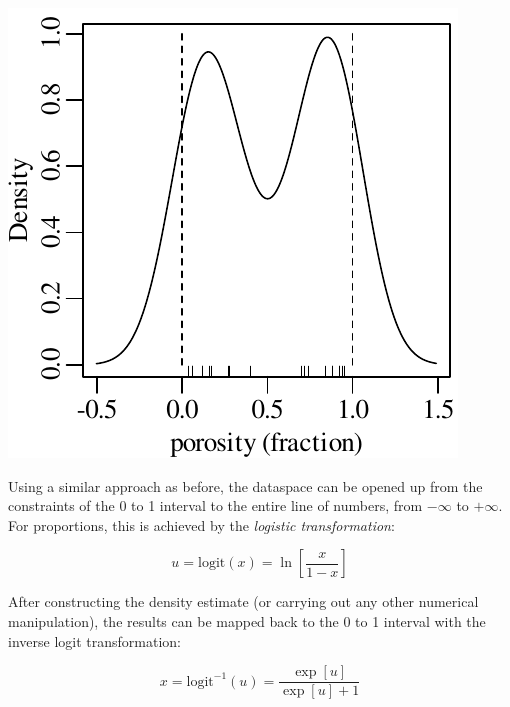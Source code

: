\noindent\begin{minipage}[t][][b]{.3\textwidth}
  \includegraphics[width=\textwidth]{../figures/porosityKDE.pdf}\\
\end{minipage}
\begin{minipage}[t][][t]{.7\textwidth}
  \label{fig:porosityKDE}
\end{minipage}

Using a similar approach as before, the dataspace can be opened up
from the constraints of the 0 to 1 interval to the entire line of
numbers, from $-\infty$ to $+\infty$. For proportions, this is
achieved by the \emph{logistic transformation}:

\begin{equation}
  u = \mbox{logit}(x) = \ln\!\left[\frac{x}{1-x}\right]
  \label{eq:logit}
\end{equation}

After constructing the density estimate (or carrying out any other
numerical manipulation), the results can be mapped back to the 0 to 1
interval with the inverse logit transformation:

\begin{equation}
  x = \mbox{logit}^{-1}(u) = \frac{\exp[u]}{\exp[u]+1}
  \label{eq:invlogit}
\end{equation}

